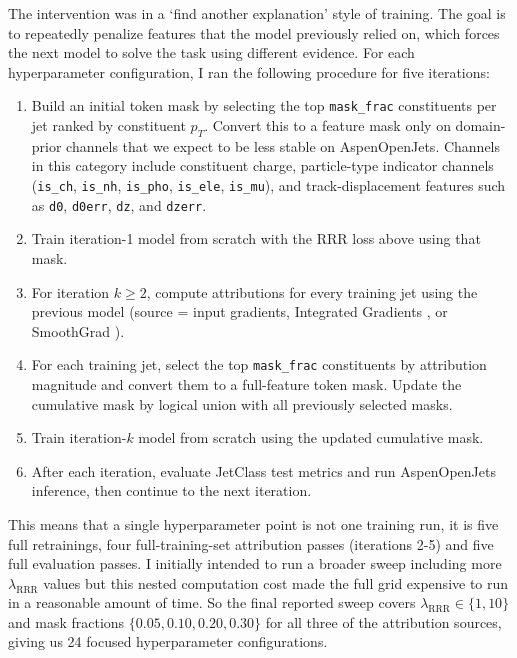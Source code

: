 \documentclass[11pt]{article}
\begin{document}
The intervention was in a ‘find another explanation’ style of training. The goal is to repeatedly penalize features that the model previously relied on, which forces the next model to solve the task using different evidence. For each hyperparameter configuration, I ran the following procedure for five iterations:

\begin{enumerate}
\item Build an initial token mask by selecting the top \texttt{mask\_frac} constituents per jet ranked by constituent $p_T$. Convert this to a feature mask only on domain-prior channels that we expect to be less stable on AspenOpenJets. Channels in this category include constituent charge, particle-type indicator channels (\texttt{is\_ch}, \texttt{is\_nh}, \texttt{is\_pho}, \texttt{is\_ele}, \texttt{is\_mu}), and track-displacement features such as \texttt{d0}, \texttt{d0err}, \texttt{dz}, and \texttt{dzerr}.
\item Train iteration-1 model from scratch with the RRR loss above using that mask.
\item For iteration $k\ge 2$, compute attributions for every training jet using the previous model (source = input gradients, Integrated Gradients \cite{sundararajan2017axiomatic}, or SmoothGrad \cite{smilkov2017smoothgrad}).
\item For each training jet, select the top \texttt{mask\_frac} constituents by attribution magnitude and convert them to a full-feature token mask. Update the cumulative mask by logical union with all previously selected masks.
\item Train iteration-$k$ model from scratch using the updated cumulative mask.
\item After each iteration, evaluate JetClass test metrics and run AspenOpenJets inference, then continue to the next iteration.
\end{enumerate}

This means that a single hyperparameter point is not one training run, it is five full retrainings, four full-training-set attribution passes (iterations 2-5) and five full evaluation passes. I initially intended to run a broader sweep including more $\lambda_{\mathrm{RRR}}$ values but this nested computation cost made the full grid expensive to run in a reasonable amount of time. So the final reported sweep covers $\lambda_{\mathrm{RRR}}\in\{1,10\}$ and mask fractions $\{0.05,0.10,0.20,0.30\}$ for all three of the attribution sources, giving us 24 focused hyperparameter configurations.
\end{document}
